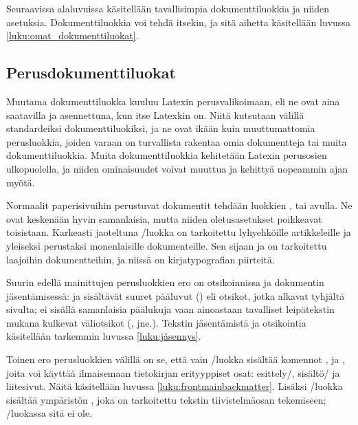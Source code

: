 Seuraavissa alaluvuissa käsitellään tavallisimpia dokumenttiluokkia ja
niiden asetuksia. Dokumenttiluokkia voi tehdä itsekin, ja sitä aihetta
käsitellään luvussa \ref{luku:omat_dokumenttiluokat}.

\subsection{Perusdokumenttiluokat}

Muutama dokumenttiluokka kuuluu Latexin perusvalikoimaan, eli ne ovat
aina saatavilla ja asennettuna, kun itse Latexkin on. Niitä kutsutaan
välillä standardeiksi dokumenttiluokiksi, ja ne ovat ikään kuin
muuttumattomia perusluokkia, joiden varaan on turvallista rakentaa omia
dokumentteja tai muita dokumenttiluokkia. Muita dokumenttiluokkia
kehitetään Latexin perusosien ulkopuolella, ja niiden ominaisuudet
voivat muuttua ja kehittyä nopeammin ajan myötä.

Normaalit paperisivuihin perustuvat dokumentit tehdään luokkien
,  tai  avulla.
   Ne ovat
keskenään hyvin samanlaisia, mutta niiden oletusasetukset poikkeavat
toisistaan. Karkeasti jaoteltuna \-/luokka on tarkoitettu
lyhyehköille artikkeleille ja yleiseksi perustaksi monenlaisille
dokumenteille. Sen sijaan  ja  on tarkoitettu
laajoihin dokumentteihin, ja niissä on kirja\-typo\-grafian piirteitä.

Suurin edellä mainittujen perusluokkien ero on otsikoinnissa ja
dokumentin jäsentämisessä:  ja  sisältävät
suuret pääluvut () eli otsikot, jotka alkavat
tyhjältä sivulta;  ei sisällä samanlaisia päälukuja vaan
ainoastaan tavalliset leipätekstin mukana kulkevat väliotsikot
(,  jne.). Tekstin
jäsentämistä ja otsikointia käsitellään tarkemmin luvussa
\ref{luku:jäsennys}.

Toinen ero perusluokkien välillä on se, että vain \-/luokka
sisältää komennot ,  ja
, joita voi käyttää ilmaisemaan tietokirjan
erityyppiset osat: esittely\-/, sisältö\-/{} ja liitesivut. Näitä
käsitellään luvussa \ref{luku:frontmainbackmatter}. Lisäksi
\-/luokka sisältää ympäristön , joka on
tarkoitettu tekstin tiivis\-telmä\-osan tekemiseen;
\-/luokassa sitä ei ole.

